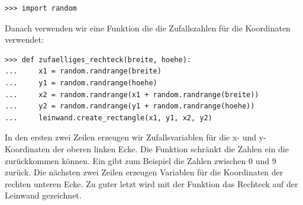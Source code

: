\begin{Verbatim}[frame=single]
>>> import random
\end{Verbatim}

Danach verwenden wir eine Funktion die die Zufallszahlen für die Koordinaten verwendet:

\begin{Verbatim}[frame=single]
>>> def zufaelliges_rechteck(breite, hoehe):
...     x1 = random.randrange(breite)
...     y1 = random.randrange(hoehe)
...     x2 = random.randrange(x1 + random.randrange(breite))
...     y2 = random.randrange(y1 + random.randrange(hoehe))
...     leinwand.create_rectangle(x1, y1, x2, y2)
\end{Verbatim}

In den ersten zwei Zeilen erzeugen wir Zufallsvariablen für die x- und y-Koordinaten der oberen linken Ecke. Die  Funktion schränkt die Zahlen ein die zurückkommen können. Ein  gibt zum Beispiel die Zahlen zwischen 0 und 9 zurück. Die nächsten zwei Zeilen erzeugen Variablen für die Koordinaten der rechten unteren Ecke. Zu guter letzt wird mit der  Funktion das Rechteck auf der Leinwand gezeichnet.

